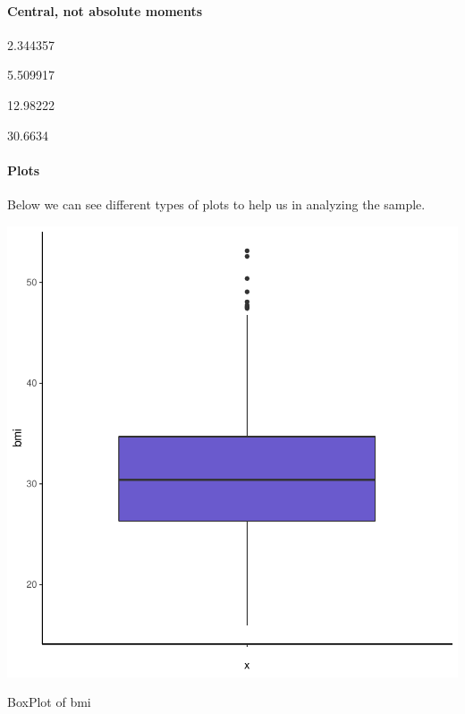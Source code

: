 \documentclass{article}
\begin{document}
\paragraph{ Central, not absolute moments \newline} 
\begin{Schunk}
\begin{Soutput}
[1] 2.344357
\end{Soutput}
\begin{Soutput}
[1] 5.509917
\end{Soutput}
\begin{Soutput}
[1] 12.98222
\end{Soutput}
\begin{Soutput}
[1] 30.6634
\end{Soutput}
\end{Schunk}

\paragraph{Plots \newline} 
Below we can see different types of plots to help us in analyzing the sample.

\begin{centerfig}
\includegraphics{Untitled-020}
\caption{BoxPlot of bmi}
\end{centerfig}
\end{document}
